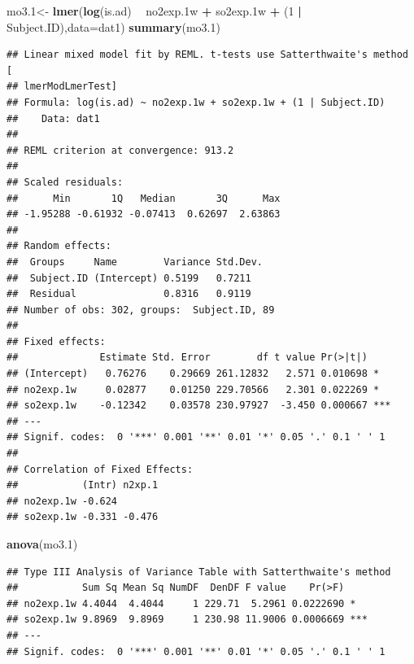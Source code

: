 \documentclass[12pt,]{article}
\newenvironment{Shaded}{\begin{snugshade}}{\end{snugshade}}
\newcommand{\DataTypeTok}[1]{\textcolor[rgb]{0.13,0.29,0.53}{#1}}
\newcommand{\DecValTok}[1]{\textcolor[rgb]{0.00,0.00,0.81}{#1}}
\newcommand{\FloatTok}[1]{\textcolor[rgb]{0.00,0.00,0.81}{#1}}
\newcommand{\KeywordTok}[1]{\textcolor[rgb]{0.13,0.29,0.53}{\textbf{#1}}}
\newcommand{\NormalTok}[1]{#1}
\newcommand{\OperatorTok}[1]{\textcolor[rgb]{0.81,0.36,0.00}{\textbf{#1}}}
\newcommand{\StringTok}[1]{\textcolor[rgb]{0.31,0.60,0.02}{#1}}
\begin{document}
\begin{Shaded}
\begin{Highlighting}[]
\NormalTok{mo3}\FloatTok{.1}\NormalTok{<-}\StringTok{ }\KeywordTok{lmer}\NormalTok{(}\KeywordTok{log}\NormalTok{(is.ad) }\OperatorTok{~}\StringTok{ }\NormalTok{no2exp}\FloatTok{.1}\NormalTok{w }\OperatorTok{+}\StringTok{ }\NormalTok{so2exp}\FloatTok{.1}\NormalTok{w }\OperatorTok{+}\StringTok{ }\NormalTok{(}\DecValTok{1} \OperatorTok{|}\StringTok{ }\NormalTok{Subject.ID),}\DataTypeTok{data=}\NormalTok{dat1)}
\KeywordTok{summary}\NormalTok{(mo3}\FloatTok{.1}\NormalTok{)}
\end{Highlighting}
\end{Shaded}

\begin{verbatim}
## Linear mixed model fit by REML. t-tests use Satterthwaite's method [
## lmerModLmerTest]
## Formula: log(is.ad) ~ no2exp.1w + so2exp.1w + (1 | Subject.ID)
##    Data: dat1
## 
## REML criterion at convergence: 913.2
## 
## Scaled residuals: 
##      Min       1Q   Median       3Q      Max 
## -1.95288 -0.61932 -0.07413  0.62697  2.63863 
## 
## Random effects:
##  Groups     Name        Variance Std.Dev.
##  Subject.ID (Intercept) 0.5199   0.7211  
##  Residual               0.8316   0.9119  
## Number of obs: 302, groups:  Subject.ID, 89
## 
## Fixed effects:
##              Estimate Std. Error        df t value Pr(>|t|)    
## (Intercept)   0.76276    0.29669 261.12832   2.571 0.010698 *  
## no2exp.1w     0.02877    0.01250 229.70566   2.301 0.022269 *  
## so2exp.1w    -0.12342    0.03578 230.97927  -3.450 0.000667 ***
## ---
## Signif. codes:  0 '***' 0.001 '**' 0.01 '*' 0.05 '.' 0.1 ' ' 1
## 
## Correlation of Fixed Effects:
##           (Intr) n2xp.1
## no2exp.1w -0.624       
## so2exp.1w -0.331 -0.476
\end{verbatim}

\begin{Shaded}
\begin{Highlighting}[]
\KeywordTok{anova}\NormalTok{(mo3}\FloatTok{.1}\NormalTok{)}
\end{Highlighting}
\end{Shaded}

\begin{verbatim}
## Type III Analysis of Variance Table with Satterthwaite's method
##           Sum Sq Mean Sq NumDF  DenDF F value    Pr(>F)    
## no2exp.1w 4.4044  4.4044     1 229.71  5.2961 0.0222690 *  
## so2exp.1w 9.8969  9.8969     1 230.98 11.9006 0.0006669 ***
## ---
## Signif. codes:  0 '***' 0.001 '**' 0.01 '*' 0.05 '.' 0.1 ' ' 1
\end{verbatim}
\end{document}
